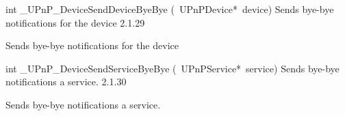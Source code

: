 \documentclass{article}
\begin{document}
\begin{cxxentry}
\begin{cxxentry}
\begin{cxxfunction}
\begin{cxxdoc}
\end{cxxdoc}
\end{cxxfunction}
\begin{cxxfunction}
{int}
        {\_UPnP\_DeviceSendDeviceByeBye}
        {(\ UPnPDevice*\ device)}
        {Sends bye-bye notifications for the device}
        {2.1.29}
\begin{cxxdoc}
Sends bye-bye notifications for the device


\end{cxxdoc}
\end{cxxfunction}
\begin{cxxfunction}
{int}
        {\_UPnP\_DeviceSendServiceByeBye}
        {(\ UPnPService*\ service)}
        {Sends bye-bye notifications a service.}
        {2.1.30}
\begin{cxxdoc}
Sends bye-bye notifications a service.



\end{cxxdoc}
\end{cxxfunction}
\end{cxxentry}
\end{cxxentry}
\end{document}
